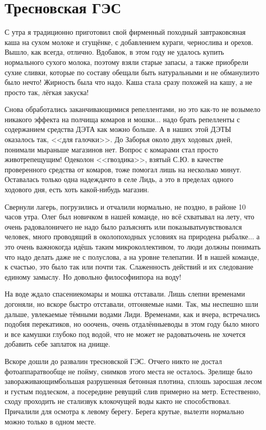 \chapter{Тресновская ГЭС} 

С утра я традиционно приготовил свой фирменный походный завтрак\mdash овсяная каша на сухом молоке и сгущёнке, с добавлением кураги, чернослива и орехов. Вышло, как всегда, отлично. Вдобавок, в этом году не удалось купить нормального сухого молока, поэтому взяли старые запасы, а также приобрели сухие сливки, которые по составу обещали быть натуральными и не обманули\mdash это было нечто! Жирность была что надо. Каша стала сразу похожей на кашу, а не просто так, лёгкая закуска! 

Снова обработались заканчивающимися репеллентами, но это как-то не возымело никакого эффекта на полчища комаров и мошки$\ldots$ надо брать репелленты с содержанием средства ДЭТА как можно больше. А в наших этой ДЭТЫ оказалось так, <<для галочки>>. До Заборья около двух ходовых дней, понимали мы\mdash раньше магазинов нет. Вопрос с комарами стал просто животрепещущим! Одеколон <<гвоздика>>, взятый С.Ю. в качестве проверенного средства от комаров, тоже помогал лишь на несколько минут. Оставалась только одна надежда\mdash что в селе Лидь, а это в пределах одного ходового дня, есть хоть какой-нибудь магазин.

Свернули лагерь, погрузились и отчалили нормально, не поздно, в районе 10 часов утра. Олег был новичком в нашей команде, но всё схватывал на лету, что очень радовало\mdash ничего не надо было разъяснять или показывать\mdash чувствовался человек, много проводящий в околопоходных условиях на природе\mdash на рыбалке$\ldots$ а это очень важно\mdash когда идёшь таким микроколлективом, то люди должны понимать что надо делать даже не с полуслова, а на уровне телепатии. И в нашей команде, к счастью, это было так или почти так. Слаженность действий и их следование единому замыслу. Но довольно философии\mdash пора на воду!

На воде ждало спасение\mdash комары и мошка отставали. Лишь слепни временами догоняли, но вскоре быстро отставали, отгоняемые нами. Так, мы неспешно шли дальше, увлекаемые тёмными водами Лиди. Временами, как и вчера, встречались подобия перекатиков, но о\sdash о\sdash очень, очень отдалённые\mdash воды в этом году было много и все камушки глубоко под водой, что не может не радовать\mdash очень не хочется добавить себе заплаток на днище. 

Вскоре дошли до развалин тресновской ГЭС. Отчего никто не достал фотоаппарат\mdash вообще не пойму, снимков этого места не осталось. Зрелище было завораживающим\mdash большая разрушенная бетонная плотина, сплошь заросшая лесом и густым подлеском, а посередине ревущий слив примерно на метр. Естественно, сходу проходить не стали\mdash звук клокочущей воды как\sdash то не способствовал. Причалили для осмотра к левому берегу. Берега крутые, вылезти нормально можно только в одном месте. 

